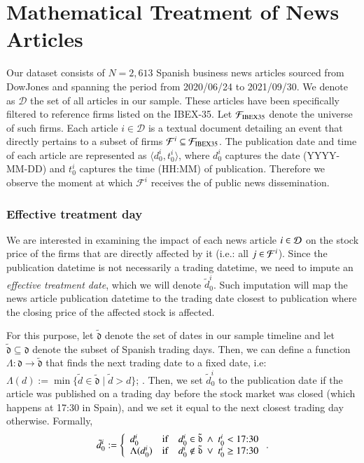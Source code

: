\section{Mathematical Treatment of News Articles}

Our dataset consists of $N=2,613$ Spanish business news articles 
 sourced from DowJones and spanning the period from 2020/06/24 to 2021/09/30. 
 We denote as $\mathcal D$ the set of all articles in our sample.
 These articles have been specifically filtered to reference firms listed on the IBEX-35.
 Let $\F_{\t{IBEX35}}$ denote the universe of such firms. 
 Each article $i \in \mathcal{D}$ is a textual document detailing an event that directly pertains to a subset of firms $\mathcal{F}^i \subseteq \F_{\t{IBEX35}}$.
The publication date and time of each article are represented as 
$\langle d_0^i, t_0^i \rangle$, 
where $d_0^i$ captures the date 
(YYYY-MM-DD) 
and $t_0^i$ captures the time
 (HH:MM) 
 of publication. 
Therefore we observe the moment at which $\mathcal{F}^i$ receives the  of public news dissemination. 

\subsubsection*{Effective treatment day}
We are interested in examining the impact of each news article $i\in\D$ on the stock price of the firms that are directly affected by it (i.e.: all $j\in\F^i$). 
%
Since the publication datetime is not necessarily a trading datetime, we need to impute an \textit{effective treatment date}, which we will denote $\tilde d_0^i$. Such imputation will map the news article publication datetime to the trading date closest to publication where the closing price of the affected stock is affected.

For this purpose, let $\tilde{\mathfrak d}$ denote the set of dates in our sample timeline and let $\tilde{\mathfrak d}\subseteq {\mathfrak d}$ denote the subset of Spanish trading days. Then, we can define a function $\Lambda:\mathfrak d \to \tilde{\mathfrak d}$ that finds the next trading date to a fixed date, i.e: 
$\Lambda(d) 
:= 
\min \{ \tilde{d} \in \tilde{\mathfrak{d}} \mid \tilde{d} > d \}$; 
. Then, we set $\tilde d_0^i$ to the publication date if the article was published on a trading day before the stock market was closed (which happens at 17:30 in Spain), and we set it equal to the next closest trading day otherwise. Formally,
\begin{align*}
\tilde{d}_0^i :=
\mycases{llll}{
d_0^i & \IF & d_0^i \in \tilde{\mathfrak d} ~\wedge~t_0^i < \t{17:30}
\\
\Lambda(d_0^i)
& \IF & d_0^i \not \in \tilde{\mathfrak d} ~\vee~t_0^i \geq  \t{17:30}
}
.
\end{align*}

